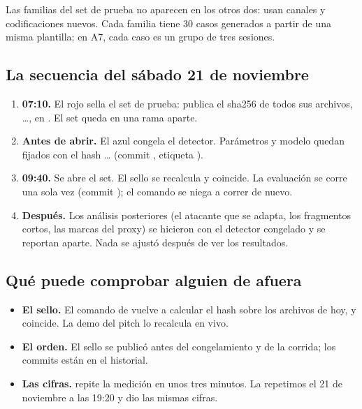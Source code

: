 Las familias del set de prueba no aparecen en los otros dos: usan canales y codificaciones nuevos.
Cada familia tiene 30 casos generados a partir de una misma plantilla; en A7, cada caso es un grupo de
tres sesiones.

\subsection{La secuencia del sábado 21 de noviembre}

\begin{enumerate}
  \item \textbf{07:10.} El rojo sella el set de prueba: publica el sha256 de todos sus archivos,
    …, en . El set queda en una rama aparte.
  \item \textbf{Antes de abrir.} El azul congela el detector. Parámetros y modelo quedan fijados con el
    hash … (commit , etiqueta ).
  \item \textbf{09:40.} Se abre el set. El sello se recalcula y coincide. La evaluación se corre una
    sola vez (commit ); el comando se niega a correr de nuevo.
  \item \textbf{Después.} Los análisis posteriores (el atacante que se adapta, los fragmentos cortos,
    las marcas del proxy) se hicieron con el detector congelado y se reportan aparte. Nada se ajustó
    después de ver los resultados.
\end{enumerate}

\subsection{Qué puede comprobar alguien de afuera}

\begin{itemize}
  \item \textbf{El sello.} El comando de  vuelve a calcular el hash sobre los
    archivos de hoy, y coincide. La demo del pitch lo recalcula en vivo.
  \item \textbf{El orden.} El sello se publicó antes del congelamiento y de la corrida; los commits
    están en el historial.
  \item \textbf{Las cifras.}  repite la medición en
    unos tres minutos. La repetimos el 21 de noviembre a las 19:20 y dio las mismas cifras.
\end{itemize}

